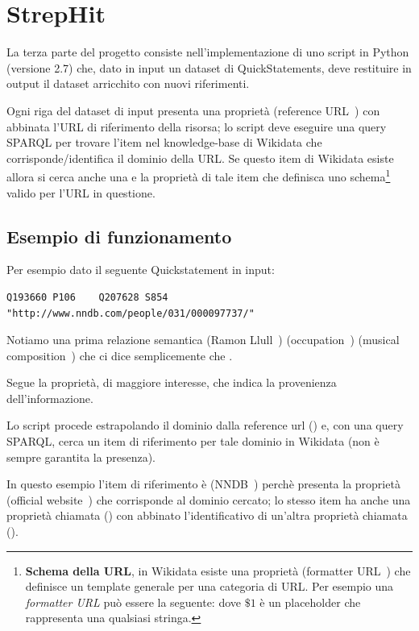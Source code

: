 \chapter{StrepHit}
\label{cha:strephit}
La terza parte del progetto consiste nell'implementazione di uno script in Python (versione 2.7) che, dato in input un dataset di QuickStatements, deve restituire in output il dataset
arricchito con nuovi riferimenti.

Ogni riga del dataset di input presenta una proprietà  (reference URL~\cite{P854}) con abbinata l'URL di riferimento della risorsa; 
lo script deve eseguire una query SPARQL per trovare l'item nel knowledge-base di Wikidata che corrisponde/identifica il dominio della URL. 
Se questo item di Wikidata esiste allora si cerca anche una e la proprietà di tale item che definisca uno schema\footnote{
    \textbf{Schema della URL}, in Wikidata esiste una proprietà  (formatter URL~\cite{P1630}) che definisce un template generale per una categoria di URL. 
    Per esempio una \textit{formatter URL} può essere la seguente:  dove $\$1$ è un placeholder che rappresenta una qualsiasi stringa.  
} valido per l'URL in questione.

\section{Esempio di funzionamento}
Per esempio dato il seguente Quickstatement in input:
\begin{lstlisting}[style=QuickstatementsStyle, caption=Riga del dump]
    Q193660	P106	Q207628	S854	"http://www.nndb.com/people/031/000097737/"
\end{lstlisting}

Notiamo una prima relazione semantica 
 (Ramon Llull~\cite{Q193660}) 
 (occupation~\cite{P106}) 
 (musical composition~\cite{Q207628}) 
che ci dice semplicemente che .

Segue la proprietà, di maggiore interesse,  che indica la provenienza dell'informazione. 

Lo script procede estrapolando il dominio dalla reference url () e, con una query SPARQL, cerca un item di riferimento per tale dominio in Wikidata 
(non è sempre garantita la presenza).

In questo esempio l'item di riferimento è  (NNDB~\cite{Q1373513}) perchè presenta la proprietà  (official website~\cite{P856}) che corrisponde al dominio cercato;
lo stesso item ha anche una proprietà chiamata  () con abbinato l'identificativo di un'altra proprietà chiamata  
 ().

